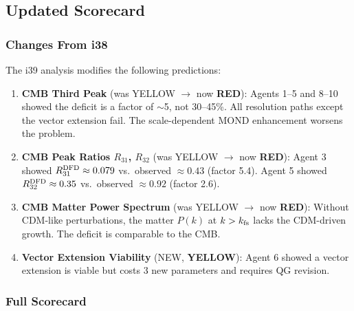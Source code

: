 \documentclass[11pt,a4paper]{article}
\newcommand{\YELLOW}{\textcolor{dfdyellow}{\textbf{YELLOW}}}
\newcommand{\RED}{\textcolor{dfdred}{\textbf{RED}}}
\begin{document}
\subsection{Updated Scorecard}

\subsubsection{Changes From i38}

The i39 analysis modifies the following predictions:

\begin{enumerate}
\item \textbf{CMB Third Peak} (was YELLOW $\to$ now \RED): Agents 1--5 and 8--10 showed the deficit is a factor of $\sim$5, not 30--45\%. All resolution paths except the vector extension fail. The scale-dependent MOND enhancement worsens the problem.

\item \textbf{CMB Peak Ratios $R_{31}$, $R_{32}$} (was YELLOW $\to$ now \RED): Agent 3 showed $R_{31}^{\rm DFD} \approx 0.079$ vs.\ observed $\approx 0.43$ (factor 5.4). Agent 5 showed $R_{32}^{\rm DFD} \approx 0.35$ vs.\ observed $\approx 0.92$ (factor 2.6).

\item \textbf{CMB Matter Power Spectrum} (was YELLOW $\to$ now \RED): Without CDM-like perturbations, the matter $P(k)$ at $k > k_{\rm fs}$ lacks the CDM-driven growth. The deficit is comparable to the CMB.

\item \textbf{Vector Extension Viability} (NEW, \YELLOW): Agent 6 showed a vector extension is viable but costs 3 new parameters and requires QG revision.
\end{enumerate}

\subsubsection{Full Scorecard}
\end{document}

